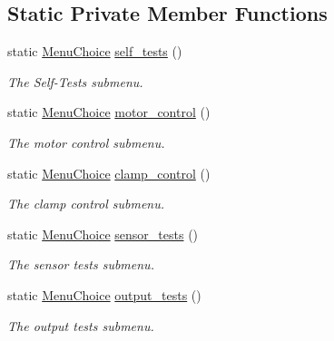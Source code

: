\subsection*{Static Private Member Functions}
\begin{DoxyCompactItemize}
\item 
static \hyperlink{namespaceIDP_ac1d3c3b62448912be4da9f2728f2af99}{MenuChoice} \hyperlink{classIDP_1_1Menu_aebca2af9fb1ec279145eaeb3fd324491}{self\_\-tests} ()
\begin{DoxyCompactList}\small\item\em The Self-\/Tests submenu. \item\end{DoxyCompactList}\item 
static \hyperlink{namespaceIDP_ac1d3c3b62448912be4da9f2728f2af99}{MenuChoice} \hyperlink{classIDP_1_1Menu_a06ddcaf58c80fbe0d58e1633a7251e21}{motor\_\-control} ()
\begin{DoxyCompactList}\small\item\em The motor control submenu. \item\end{DoxyCompactList}\item 
static \hyperlink{namespaceIDP_ac1d3c3b62448912be4da9f2728f2af99}{MenuChoice} \hyperlink{classIDP_1_1Menu_a4fdf316988d3e78a39ded863001b92a9}{clamp\_\-control} ()
\begin{DoxyCompactList}\small\item\em The clamp control submenu. \item\end{DoxyCompactList}\item 
static \hyperlink{namespaceIDP_ac1d3c3b62448912be4da9f2728f2af99}{MenuChoice} \hyperlink{classIDP_1_1Menu_a1d459fa26899328e58cc13aae1e0c37e}{sensor\_\-tests} ()
\begin{DoxyCompactList}\small\item\em The sensor tests submenu. \item\end{DoxyCompactList}\item 
static \hyperlink{namespaceIDP_ac1d3c3b62448912be4da9f2728f2af99}{MenuChoice} \hyperlink{classIDP_1_1Menu_a14dd286871d1f36f49fad1ef0fca720d}{output\_\-tests} ()
\begin{DoxyCompactList}\small\item\em The output tests submenu. \item\end{DoxyCompactList}\end{DoxyCompactItemize}


